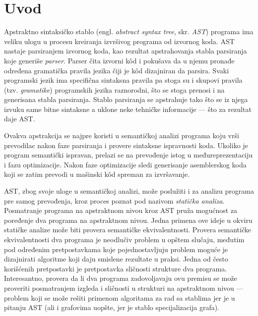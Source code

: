 \chapter{Uvod}
\label{chp:Intro}

Apstraktno sintaksičko stablo (engl. \emph{abstract syntax tree}, skr. \emph{AST}) programa ima veliku ulogu u procesu kreiranja izvršivog programa od izvornog koda. AST nastaje parsiranjem izvornog koda, kao rezultat apstrahovanja stabla parsiranja koje generiše \emph{parser}. Parser čita izvorni k\^od i pokušava da u njemu pronađe određena gramatička pravila jezika čiji je k\^od dizajniran da parsira. Svaki programski jezik ima specifična sintaksna pravila pa stoga su i skupovi pravila (tzv. \emph{gramatike}) programskih jezika raznorodni, što se stoga prenosi i na generisana stabla parsiranja. Stablo parsiranja se apstrahuje tako što se iz njega izvuku same bitne sintaksne a uklone neke tehničke informacije --- što za rezultat daje AST.

Ovakva apstrakcija se najpre koristi u semantičkoj analizi programa koju vrši prevodilac nakon faze parsiranja i provere sintaksne ispravnosti koda. Ukoliko je program semantički ispravan, prelazi se na prevođenje istog u međureprezentaciju i fazu optimizacije. Nakon faze optimizacije sledi generisanje asemblerskog koda koji se zatim prevodi u mašinski k\^od spreman za izvršavanje.

AST, zbog svoje uloge u semantičkoj analizi, može poslužiti i za analizu programa pre samog prevođenja, kroz proces poznat pod nazivom \emph{statička analiza}. Posmatranje programa na apstraktnom nivou kroz AST pruža mogućnost za poređenje dva programa na apstraktnom nivou. Jedna primena ove ideje u okviru statičke analize može biti provera semantičke ekvivalentnosti. Provera semantičke ekvivalentnosti dva programa je neodlučiv problem u opštem slučaju, međutim pod određenim pretpostavkama koje pojednostavljuju problem moguće je dizajnirati algoritme koji daju smislene rezultate u praksi. Jedna od često korišćenih pretpostavki je pretpostavka sličnosti strukture dva programa. Interesantno, provera da li dva programa zadovoljavaju ovu premisu se može proveriti posmatranjem izgleda i sličnosti u strukturi na apstraktnom nivou --- problem koji se može rešiti primenom algoritama za rad sa stablima jer je u pitanju AST (ali i grafovima uopšte, jer je stablo specijalizacija grafa).

